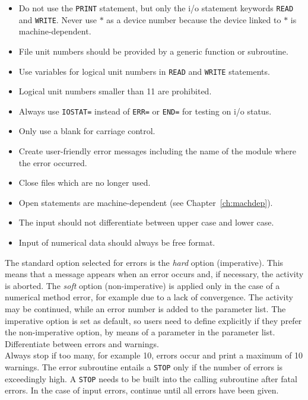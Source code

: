 \documentclass[12pt]{book}
\begin{document}
\begin{itemize}
   \item Do not use the {\tt PRINT} statement, but only the i/o statement keywords {\tt READ} and {\tt WRITE}. Never use
         $*$ as a device number because the device linked to $*$ is machine-dependent.
   \item File unit numbers should be provided by a generic function or subroutine.
   \item Use variables for logical unit numbers in {\tt READ} and {\tt WRITE} statements.
   \item Logical unit numbers smaller than 11 are prohibited.
   \item Always use {\tt IOSTAT=} instead of {\tt ERR=} or {\tt END=} for testing on i/o status.
   \item Only use a blank for carriage control.
   \item Create user-friendly error messages including the name of the module where the error occurred.
   \item Close files which are no longer used.
   \item Open statements are machine-dependent (see Chapter~\ref{ch:machdep}).
   \item The input should not differentiate between upper case and lower case.
   \item Input of numerical data should always be free format.
\end{itemize}

 \label{ch:err}

The standard option selected for errors is the \textit{hard} option (imperative). This means that a message
appears when an error occurs and, if necessary, the activity is aborted. The \textit{soft} option (non-imperative)
is applied only in the case of a numerical method error, for example due to a lack of
convergence. The activity may be continued, while an error number is added to the parameter
list. The imperative option is set as default, so users need to define explicitly if they
prefer the non-imperative option, by means of a parameter in the parameter list.
\\[2ex]
\noindent
Differentiate between errors and warnings.
\\[2ex]
\noindent
Always stop if too many, for example 10, errors
occur and print a maximum of 10 warnings. The error subroutine entails a {\tt STOP} only if the
number of errors is exceedingly high. A {\tt STOP} needs to be built into the calling subroutine
after fatal errors. In the case of input errors, continue until all errors have been given.
\end{document}
